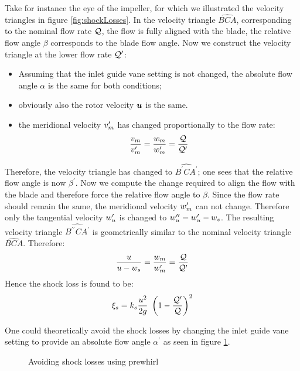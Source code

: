 Take for instance the eye of the impeller, for which we illustrated
the velocity triangles in figure \ref{fig:shockLosses}. In the
velocity triangle $\widehat{BCA}$, corresponding to the nominal flow
rate $\mathcal Q$, the flow is fully aligned with the blade, \ie the
relative flow angle $\beta$ corresponds to the blade flow angle. Now
we construct the velocity triangle at the lower flow rate
$\mathcal Q^\prime$:
\begin{itemize}
\item Assuming that the inlet guide vane setting is not changed, the
  absolute flow angle $\alpha$ is the same for both conditions;
\item obviously also the rotor velocity $\boldsymbol {u}$ is the same. 
\item the meridional velocity $v_m^\prime$ has changed
  proportionally to the flow rate:
  \begin{align*}
    \frac{v_m}{v_m^\prime} = 
    \frac{w_m}{w_m^\prime} = 
    \frac{\mathcal Q}{\mathcal Q^\prime}
  \end{align*} 
\end{itemize}
Therefore, the velocity triangle has changed to $\widehat{B^\prime C
  A^\prime}$; one sees that the relative flow angle is now
$\beta^\prime$.
Now we compute the change required to align the flow with the blade
and therefore force the relative flow angle to $\beta$. Since the flow
rate should remain the same, the meridional velocity $w_m^\prime$
can not change. Therefore only the tangential velocity
$w_u^\prime$ is changed to $w_u^{\prime\prime}=w_u^\prime
- w_s$. The resulting velocity triangle $\widehat{B^{\prime\prime}
  C A^\prime}$ is geometrically similar to the nominal velocity
triangle $\widehat{BCA}$. Therefore:
\begin{align*}
  \frac{u}{u - w_s} = \frac{w_m}{w_m^\prime} = \frac{\mathcal Q}{\mathcal Q^\prime}
\end{align*}
Hence the shock loss is found to be:
\begin{align*}
  \xi_s = k_s \frac{u^2}{2g}~\left(1 - \frac{\mathcal Q^\prime}{\mathcal Q}\right)^2
\end{align*}

One could theoretically avoid the shock losses by changing the inlet
guide vane setting to provide an absolute flow angle $\alpha^\prime$
as seen in figure \ref{fig:prewhirl}.
\begin{figure}[!h]
  \centering{
    
  }
  \caption{Avoiding shock losses using prewhirl}
  \label{fig:prewhirl}
\end{figure}



